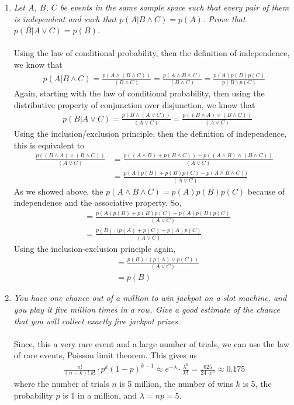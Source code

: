 \documentclass[12pt]{article}
\begin{document}
\begin{enumerate}
\item\emph{Let $A$, $B$, $C$ be events in the same sample space such that every pair of them is independent and such that $p(A|B \land C) = p(A)$. Prove that
$p(B|A \lor C) = p(B)$.} \\
\\
Using the law of conditional probability, then the definition of independence, we know that
\begin{align}
\nonumber p(A|B \land C) = \frac{p(A \land (B \land C))}{(B \land C)} = \frac{p(A \land B \land C)}{(B \land C)} = \frac{p(A)p(B)p(C)}{p(B)p(C)}
\end{align}
Again, starting with the law of conditional probability, then using the distributive property of conjunction over disjunction, we know that 
\begin{align}
\nonumber &p(B|A \lor C) = \frac{p(B \land (A \lor C))}{(A \lor C)} = \frac{p((B \land A) \lor (B \land C))}{(A \lor C)}
\end{align} 
Using the inclusion/exclusion principle, then the definition of independence, this is equivalent to 
\begin{align}
\nonumber\frac{p((B \land A) \lor (B \land C))}{(A \lor C)} &= \frac{p((A \land B) + p(B \land C)) - p((A \land B) \land (B \land C))}{(A \lor C)} \\
\nonumber&= \frac{p(A)p(B) + p(B)p(C) - p(A \land B \land C))}{(A \lor C)}
\end{align}
As we showed above, the $p(A \land B \land C) = p(A)p(B)p(C)$ because of independence and the associative property. So,
\begin{align}
\nonumber&= \frac{p(A)p(B) + p(B)p(C) - p(A)p(B)p(C)}{(A \lor C)} \\
\nonumber&= \frac{p(B) \cdot (p(A) + p(C) - p(A)p(C)}{(A \lor C)}
\end{align}
Using the inclusion-exclusion principle again,
\begin{align}
\nonumber&= \frac{p(B) \cdot (p(A) \lor p(C))}{(A \lor C)} \\
\nonumber &= p(B)
\end{align}

\item\emph{You have one chance out of a million to win jackpot on a slot machine,
and you play it five million times in a row. Give a good estimate of
the chance that you will collect exactly five jackpot prizes.} \\
\\
Since, this a very rare event and a large number of trials, we can use the law of rare events, Poisson limit theorem. This gives us
\begin{align}
\nonumber \frac{n!}{(n-k)!\;k!}\cdot p^k(1-p)^{k-1} \approx e^{-\lambda}\cdot\frac{\lambda^k}{k!} = \frac{625}{24 \cdot e^5}\approx 0.175
\end{align}
where the number of trials $n$ is 5 million, the number of wins $k$ is 5, the probability $p$ is 1 in a million, and $\lambda = np = 5$.

\end{enumerate}
\end{document}
